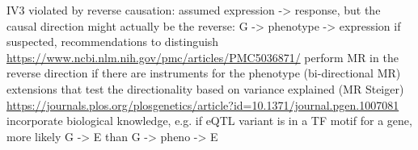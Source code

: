 \begin{outline}
\1 IV3 violated by reverse causation: assumed expression -> response, but the causal direction might actually be the reverse: G -> phenotype -> expression
    \2 if suspected, recommendations to distinguish \autocite{daveysmith2014MendelianRandomizationGenetic,hemani2018EvaluatingPotentialRole,neumeyer2020StrengtheningCausalInference} \url{https://www.ncbi.nlm.nih.gov/pmc/articles/PMC5036871/}
        \3 perform MR in the reverse direction if there are instruments for the phenotype (bi-directional MR)
        \3 extensions that test the directionality based on variance explained (MR Steiger) \url{https://journals.plos.org/plosgenetics/article?id=10.1371/journal.pgen.1007081}
        \3 incorporate biological knowledge, e.g. if eQTL variant is in a TF motif for a gene, more likely G -> E than G -> pheno -> E






\end{outline}
